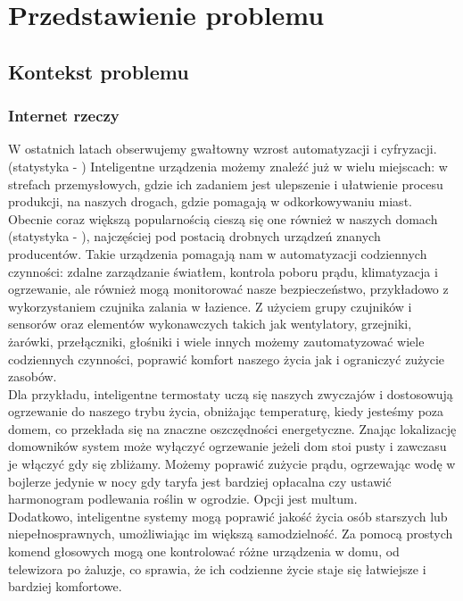 \section{Przedstawienie problemu}

\subsection{Kontekst problemu}

\subsubsection{Internet rzeczy}
W ostatnich latach obserwujemy gwałtowny wzrost automatyzacji i cyfryzacji. (statystyka - \cite{statistaconnecteddevices}) Inteligentne urządzenia możemy znaleźć już w wielu miejscach: w strefach przemysłowych, gdzie ich zadaniem jest ulepszenie i ułatwienie procesu produkcji, na naszych drogach, gdzie pomagają w odkorkowywaniu miast. Obecnie coraz większą popularnością cieszą się one również w naszych domach (statystyka - \cite{iotstatistasmarthome}), najczęściej pod postacią drobnych urządzeń znanych producentów. Takie urządzenia pomagają nam w automatyzacji codziennych czynności: zdalne zarządzanie światłem, kontrola poboru prądu, klimatyzacja i ogrzewanie, ale również mogą monitorować nasze bezpieczeństwo, przykładowo z wykorzystaniem czujnika zalania w łazience. Z użyciem grupy czujników i sensorów oraz elementów wykonawczych takich jak wentylatory, grzejniki, żarówki, przełączniki, głośniki i wiele innych możemy zautomatyzować wiele codziennych czynności, poprawić komfort naszego życia jak i ograniczyć zużycie zasobów.\\

Dla przykładu, inteligentne termostaty uczą się naszych zwyczajów i dostosowują ogrzewanie do naszego trybu życia, obniżając temperaturę, kiedy jesteśmy poza domem, co przekłada się na znaczne oszczędności energetyczne. Znając lokalizację domowników system może wyłączyć ogrzewanie jeżeli dom stoi pusty i zawczasu je włączyć gdy się zbliżamy. Możemy poprawić zużycie prądu, ogrzewając wodę w bojlerze jedynie w nocy gdy taryfa jest bardziej opłacalna czy ustawić harmonogram podlewania roślin w ogrodzie. Opcji jest multum.\\

Dodatkowo, inteligentne systemy mogą poprawić jakość życia osób starszych lub niepełnosprawnych, umożliwiając im większą samodzielność. Za pomocą prostych komend głosowych mogą one kontrolować różne urządzenia w domu, od telewizora po żaluzje, co sprawia, że ich codzienne życie staje się łatwiejsze i bardziej komfortowe.\\

